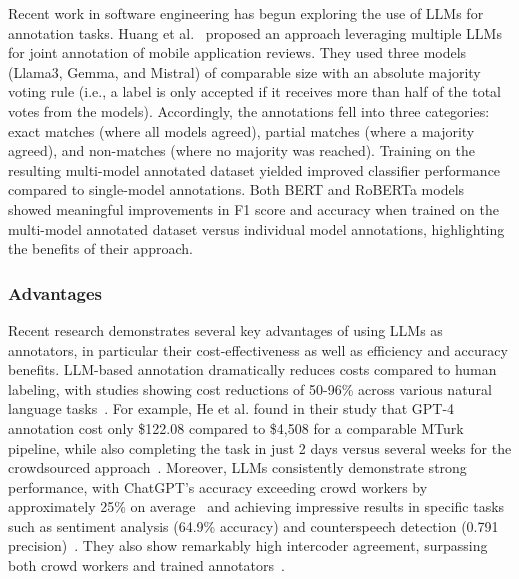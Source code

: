 Recent work in software engineering has begun exploring the use of LLMs for annotation tasks.
Huang et al.~\cite{Huang2023Enhancing} proposed an approach leveraging multiple LLMs for joint annotation of mobile application reviews. 
They used three models (Llama3, Gemma, and Mistral) of comparable size  with an absolute majority voting rule (i.e., a label is only accepted if it receives more than half of the total votes from the models). 
Accordingly, the annotations fell into three categories: exact matches (where all models agreed), partial matches (where a majority agreed), and non-matches (where no majority was reached).
Training on the resulting multi-model annotated dataset yielded improved classifier performance compared to single-model annotations. Both BERT and RoBERTa models showed meaningful improvements in F1 score and accuracy when trained on the multi-model annotated dataset versus individual model annotations, highlighting the benefits of their approach.

\subsubsection{Advantages}

Recent research demonstrates several key advantages of using LLMs as annotators, in particular their cost-effectiveness as well as efficiency and accuracy benefits.
LLM-based annotation dramatically reduces costs compared to human labeling, with studies showing cost reductions of 50-96\% across various natural language tasks~\cite{DBLP:conf/emnlp/WangLXZZ21}.
For example, He et al. found in their study that GPT-4 annotation cost only \$122.08 compared to \$4,508 for a comparable MTurk pipeline, while also completing the task in just 2 days versus several weeks for the crowdsourced approach~\cite{DBLP:conf/chi/HeHDRH24}.
Moreover, LLMs consistently demonstrate strong performance, with ChatGPT's accuracy exceeding crowd workers by approximately 25\% on average~\cite{DBLP:journals/corr/abs-2303-15056} and achieving impressive results in specific tasks such as sentiment analysis (64.9\% accuracy) and counterspeech detection (0.791 precision)~\cite{DBLP:journals/corr/abs-2304-10145}. They also show remarkably high intercoder agreement, surpassing both crowd workers and trained annotators~\cite{DBLP:journals/corr/abs-2303-15056}.

